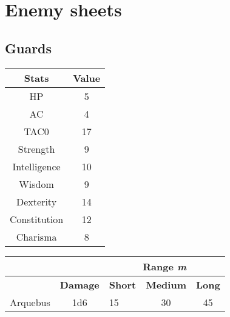 \section{Enemy sheets}
\subsection{Guards}
\begin{table}[H]
  \centering
\begin{tabular}{|c|c|}
\hline
\rowcolor[HTML]{C0C0C0}
\textbf{Stats} & \textbf{Value } \\ \hline
HP & 5 \\ \hline
AC & 4 \\ \hline
TAC0 & 17 \\ \hline
Strength & 9  \\ \hline
Intelligence & 10 \\ \hline
Wisdom & 9 \\ \hline
Dexterity & 14 \\ \hline
Constitution & 12 \\ \hline
Charisma & 8 \\ \hline
\end{tabular}
\end{table}
\begin{table}[H]
  \centering
  \begin{tabular}{lll|c|c|}
    \cline{3-5} &  & \multicolumn{3}{c|}{\cellcolor[HTML]{C0C0C0}\textbf{Range \textit{m}}} \\ \hline
    \rowcolor[HTML]{C0C0C0}
    \multicolumn{1}{|l|}{\cellcolor[HTML]{C0C0C0}\textbf{Weapon}} & \textbf{Damage} & \multicolumn{1}{l|}{\cellcolor[HTML]{C0C0C0}\textbf{Short}} & \textbf{Medium} & \textbf{Long} \\ \hline
    \multicolumn{1}{|c|}{Arquebus} & \multicolumn{1}{c|}{1d6}  & 15 & 30 & 45 \\ \hline
  \end{tabular}
\end{table}

